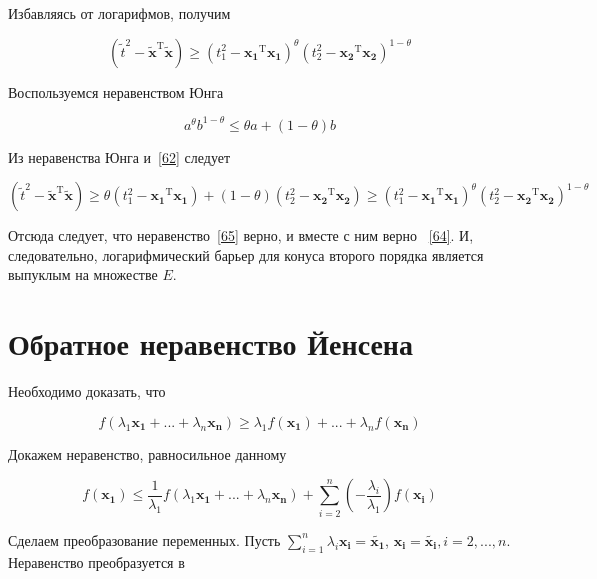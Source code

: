 	Избавляясь от логарифмов, получим
	
	\begin{equation}
	\label{65}
	(\tilde{t}^2 - \mathbf{\tilde{x}}^\text{T} \mathbf{\tilde{x}}) \geqslant (t_1^2
	- \mathbf{x_1}^\text{T} \mathbf{x_1})^{\theta} (t_2^2 - \mathbf{x_2}^\text{T}
	\mathbf{x_2})^{1-\theta}
	\end{equation}
	
	Воспользуемся неравенством Юнга
	
	\begin{equation}
	a^\theta b^{1-\theta} \leqslant \theta a + (1-\theta) b
	\end{equation}
	
	Из неравенства Юнга и~\eqref{62} следует
	
	\begin{equation}
	(\tilde{t}^2 - \mathbf{\tilde{x}}^\text{T} \mathbf{\tilde{x}})\geqslant \theta
	(t_1^2 - \mathbf{x_1}^\text{T} \mathbf{x_1}) + (1-\theta)(t_2^2 -
	\mathbf{x_2}^\text{T} \mathbf{x_2}) \geqslant (t_1^2 - \mathbf{x_1}^\text{T}
	\mathbf{x_1})^{\theta} (t_2^2 - \mathbf{x_2}^\text{T} \mathbf{x_2})^{1-\theta}
	\end{equation}
	
	Отсюда следует, что неравенство~\eqref{65} верно, и вместе с ним верно
	~\eqref{64}. И, следовательно, логарифмический барьер для конуса второго порядка
	является выпуклым на множестве $E$.
	
	\section{Обратное неравенство Йенсена}
	
	Необходимо доказать, что
	
	\begin{equation}
	f(\lambda_1 \mathbf{x_1} + ... + \lambda_n \mathbf{x_n} ) \geqslant \lambda_1
	f(\mathbf{x_1}) + ... + \lambda_n f(\mathbf{x_n})
	\end{equation}
	
	Докажем неравенство, равносильное данному
	
	\begin{equation}
	f(\mathbf{x_1})  \leqslant \frac{1}{\lambda_1}f(\lambda_1 \mathbf{x_1} +
	...+\lambda_n\mathbf{x_n})  + \sum\limits_{i=2}^{n}
	(-\frac{\lambda_i}{\lambda_1} )  f(\mathbf{x_i})
	\end{equation}
	
	Сделаем преобразование переменных. Пусть $\sum\limits_{i=1}^{n} \lambda_i
	\mathbf{x_i} = \mathbf{\tilde{x_1}}$, $\mathbf{x_i} = \mathbf{\tilde{x_i}},
	i=2,...,n$. Неравенство преобразуется в
	
